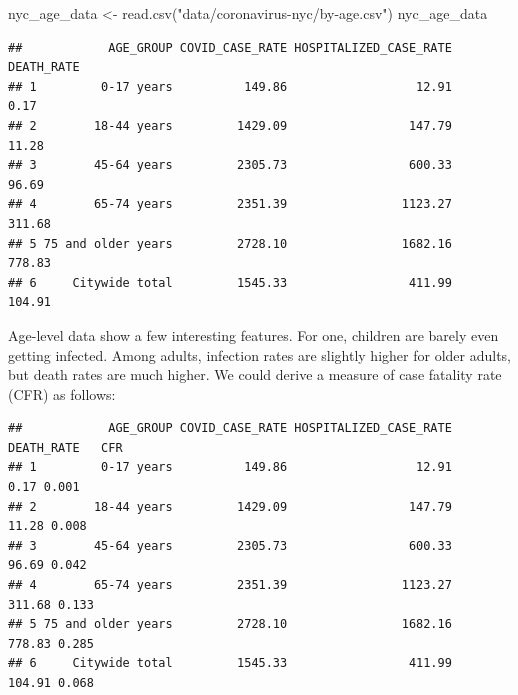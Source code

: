 \documentclass[
  openany]{book}
\newenvironment{Shaded}{\begin{snugshade}}{\end{snugshade}}
\newcommand{\DecValTok}[1]{\textcolor[rgb]{0.00,0.00,0.81}{#1}}
\newcommand{\FunctionTok}[1]{\textcolor[rgb]{0.00,0.00,0.00}{#1}}
\newcommand{\NormalTok}[1]{#1}
\newcommand{\OtherTok}[1]{\textcolor[rgb]{0.56,0.35,0.01}{#1}}
\newcommand{\SpecialCharTok}[1]{\textcolor[rgb]{0.00,0.00,0.00}{#1}}
\newcommand{\StringTok}[1]{\textcolor[rgb]{0.31,0.60,0.02}{#1}}
\begin{document}
\begin{Shaded}
\begin{Highlighting}[]
\NormalTok{nyc\_age\_data }\OtherTok{\textless{}{-}} \FunctionTok{read.csv}\NormalTok{(}\StringTok{"data/coronavirus{-}nyc/by{-}age.csv"}\NormalTok{)}
\NormalTok{nyc\_age\_data}
\end{Highlighting}
\end{Shaded}

\begin{verbatim}
##            AGE_GROUP COVID_CASE_RATE HOSPITALIZED_CASE_RATE DEATH_RATE
## 1         0-17 years          149.86                  12.91       0.17
## 2        18-44 years         1429.09                 147.79      11.28
## 3        45-64 years         2305.73                 600.33      96.69
## 4        65-74 years         2351.39                1123.27     311.68
## 5 75 and older years         2728.10                1682.16     778.83
## 6     Citywide total         1545.33                 411.99     104.91
\end{verbatim}

Age-level data show a few interesting features. For one, children are barely even getting infected. Among adults, infection rates are slightly higher for older adults, but death rates are much higher. We could derive a measure of case fatality rate (CFR) as follows:

\begin{Shaded}
\end{Shaded}

\begin{verbatim}
##            AGE_GROUP COVID_CASE_RATE HOSPITALIZED_CASE_RATE DEATH_RATE   CFR
## 1         0-17 years          149.86                  12.91       0.17 0.001
## 2        18-44 years         1429.09                 147.79      11.28 0.008
## 3        45-64 years         2305.73                 600.33      96.69 0.042
## 4        65-74 years         2351.39                1123.27     311.68 0.133
## 5 75 and older years         2728.10                1682.16     778.83 0.285
## 6     Citywide total         1545.33                 411.99     104.91 0.068
\end{verbatim}
\end{document}
